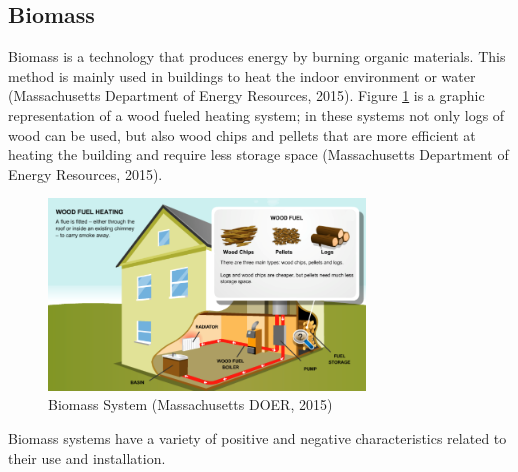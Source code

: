     \subsection{Biomass}
    \par Biomass is a technology that produces energy by burning organic materials. This method is mainly used in buildings to heat the indoor environment or water (Massachusetts Department of Energy Resources, 2015). Figure \ref{fig:bio} is a graphic representation of a wood fueled heating system; in these systems not only logs of wood can be used, but also wood chips and pellets that are more efficient at heating the building and require less storage space (Massachusetts Department of Energy Resources, 2015).
    \begin{figure}[h]
      \centering
        \includegraphics[width=0.75\textwidth]{images/05-BiomassSystem}
      \caption{Biomass System (Massachusetts DOER, 2015)}
      \label{fig:bio}
    \end{figure}
    \par Biomass systems have a variety of positive and negative characteristics related to their use and installation.\\
    
